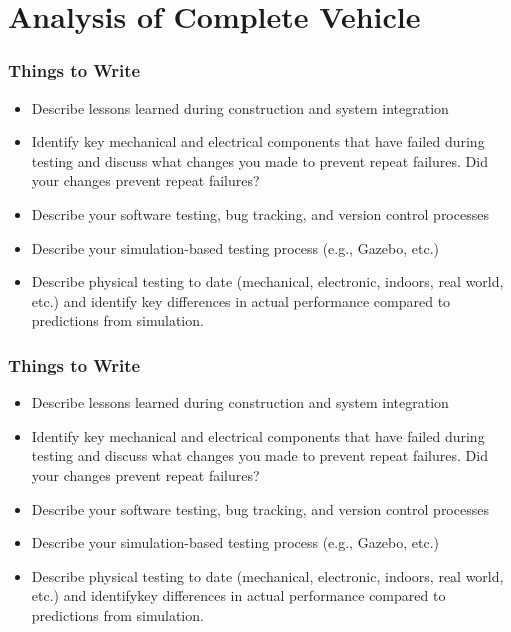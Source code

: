\section{Analysis of Complete Vehicle}
\subsubsection*{Things to Write}

\begin{itemize}
  \item Describe lessons learned during construction and system integration
  \item Identify key mechanical and electrical components that have failed during testing and discuss what changes you made to prevent repeat failures. Did your changes prevent repeat failures?
  \item Describe your software testing, bug tracking, and version control processes
  \item Describe your simulation-based testing process (e.g., Gazebo, etc.)
  \item Describe physical testing to date (mechanical, electronic, indoors, real world, etc.) and identify key differences in actual performance compared to predictions from simulation.
\end{itemize}

\subsubsection*{Things to Write}

\begin{itemize}
  \item Describe lessons learned during construction and system integration
  \item Identify key mechanical and electrical components that have failed during testing and discuss what changes you made to prevent repeat failures. Did your changes prevent repeat failures?
  \item Describe your software testing, bug tracking, and version control processes
  \item Describe your simulation-based testing process (e.g., Gazebo, etc.)
  \item Describe physical testing to date (mechanical, electronic, indoors, real world, etc.) and identifykey differences in actual performance compared to predictions from simulation.
\end{itemize}
